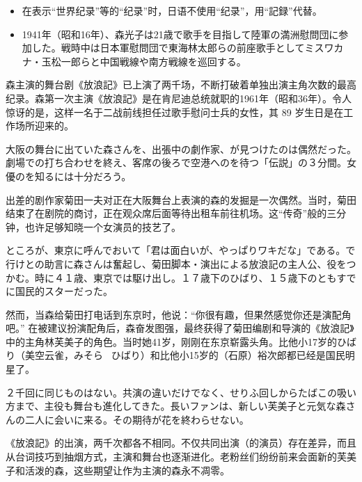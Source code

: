 \documentclass{ctexart}
\newcommand{\bbigbreak}{\bigbreak \bigbreak}
\begin{document}
\begin{itemize}
    \rmfamily
    \item 在表示“世界纪录”等的“纪录”时，日语不使用“纪录”，用“記録”代替。
    \mincho
    \item 1941年（昭和16年）、森光子は21歳で歌手を目指して陸軍の満洲慰問団に参加した。戦時中は日本軍慰問団で東海林太郎らの前座歌手としてミスワカナ・玉松一郎らと中国戦線や南方戦線を巡回する。
\end{itemize}

\rmfamily
森主演的舞台剧《放浪記》已上演了两千场，不断打破着单独出演主角次数的最高纪录。森第一次主演《放浪記》是在肯尼迪总统就职的1961年（昭和36年）。令人惊讶的是，这样一名于二战前线担任过歌手慰问士兵的女性，其 89 岁生日是在工作场所迎来的。

\bbigbreak

\mincho
大阪の舞台に出ていた森さんを、出張中の劇作家、が見つけたのは偶然だった。劇場での打ち合わせを終え、客席の後ろで空港へのを待つ「伝説」の３分間。女優のを知るには十分だろう。

\rmfamily
出差的剧作家菊田一夫对正在大阪舞台上表演的森的发掘是一次偶然。当时，菊田结束了在剧院的商讨，正在观众席后面等待出租车前往机场。这“传奇”般的三分钟，也许足够知晓一个女演员的技艺了。

\bbigbreak

\mincho
ところが、東京に呼んでおいて「君は面白いが、やっぱりワキだな」である。で行けとの助言に森さんは奮起し、菊田脚本・演出による放浪記の主人公、役をつかむ。時に４１歳、東京では駆け出し。１７歳下のひばり、１５歳下のともすでに国民的スターだった。

\rmfamily
然而，当森给菊田打电话到东京时，他说：“你很有趣，但果然感觉你还是演配角吧。” 在被建议扮演配角后，森奋发图强，最终获得了菊田编剧和导演的《放浪記》中的主角林芙美子的角色。当时她41岁，刚刚在东京崭露头角。比他小17岁的ひばり（美空云雀，みそら \ ひばり）和比他小15岁的（石原）裕次郎都已经是国民明星了。

\bbigbreak

\mincho
２千回に同じものはない。共演の違いだけでなく、せりふ回しからたばこの吸い方まで、主役も舞台も進化してきた。長いファンは、新しい芙美子と元気な森さんの二人に会いに来る。その期待が花を終わらせない。

\rmfamily
《放浪記》的出演，两千次都各不相同。不仅共同出演（的演员）存在差异，而且从台词技巧到抽烟方式，主演和舞台也逐渐进化。老粉丝们纷纷前来会面新的芙美子和活泼的森，这些期望让作为主演的森永不凋零。
\end{document}
